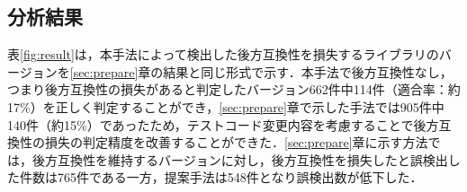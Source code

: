 \documentclass[submit]{ipsj}
\begin{document}
{\vspace{-2mm}
\subsection{分析結果}


\begin{table}[t]
\centering
\caption{テストコード変更内容に基づく後方互換性損失の検出結果}
\label{fig:result}
\vspace{-4mm}
\end{table}

表\ref{fig:result}は，本手法によって検出した後方互換性を損失するライブラリのバージョンを\ref{sec:prepare}章の結果と同じ形式で示す．本手法で後方互換性なし，つまり後方互換性の損失があると判定したバージョン662件中114件（適合率：約17\%）を正しく判定することができ，\ref{sec:prepare}章で示した手法では905件中140件（約15\%）であったため，テストコード変更内容を考慮することで後方互換性の損失の判定精度を改善することができた．\ref{sec:prepare}章に示す方法では，後方互換性を維持するバージョンに対し，後方互換性を損失したと誤検出した件数は765件である一方，提案手法は548件となり誤検出数が低下した．

}
\end{document}
